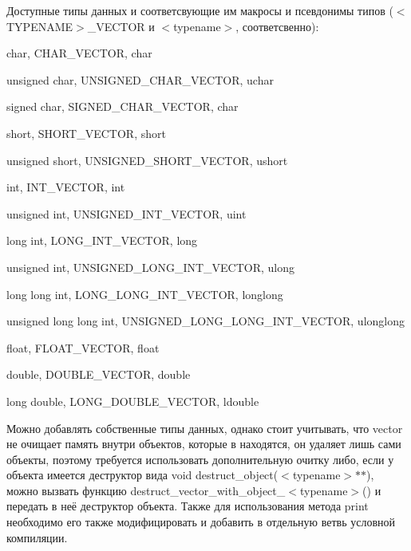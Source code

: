 Доступные типы данных и соответсвующие им макросы и псевдонимы типов ($<$\+TYPENAME$>$\+\_\+\+VECTOR и $<$typename$>$, соответсвенно)\+:
\begin{DoxyEnumerate}
\item char, CHAR\+\_\+\+VECTOR, char
\item unsigned char, UNSIGNED\+\_\+\+CHAR\+\_\+\+VECTOR, uchar
\item signed char, SIGNED\+\_\+\+CHAR\+\_\+\+VECTOR, char
\item short, SHORT\+\_\+\+VECTOR, short
\item unsigned short, UNSIGNED\+\_\+\+SHORT\+\_\+\+VECTOR, ushort
\item int, INT\+\_\+\+VECTOR, int
\item unsigned int, UNSIGNED\+\_\+\+INT\+\_\+\+VECTOR, uint
\item long int, LONG\+\_\+\+INT\+\_\+\+VECTOR, long
\item unsigned int, UNSIGNED\+\_\+\+LONG\+\_\+\+INT\+\_\+\+VECTOR, ulong
\item long long int, LONG\+\_\+\+LONG\+\_\+\+INT\+\_\+\+VECTOR, longlong
\item unsigned long long int, UNSIGNED\+\_\+\+LONG\+\_\+\+LONG\+\_\+\+INT\+\_\+\+VECTOR, ulonglong
\item float, FLOAT\+\_\+\+VECTOR, float
\item double, DOUBLE\+\_\+\+VECTOR, double
\item long double, LONG\+\_\+\+DOUBLE\+\_\+\+VECTOR, ldouble
\end{DoxyEnumerate}

Можно добавлять собственные типы данных, однако стоит учитывать, что vector не очищает память внутри объектов, которые в находятся, он удаляет лишь сами объекты, поэтому требуется использовать дополнительную очитку либо, если у объекта имеется деструктор вида void destruct\+\_\+object($<$typename$>$\texorpdfstring{$\ast$}{*}\texorpdfstring{$\ast$}{*}), можно вызвать функцию destruct\+\_\+vector\+\_\+with\+\_\+object\+\_\+$<$typename$>$() и передать в неё деструктор объекта. Также для использования метода print необходимо его также модифицировать и добавить в отдельную ветвь условной компиляции. 